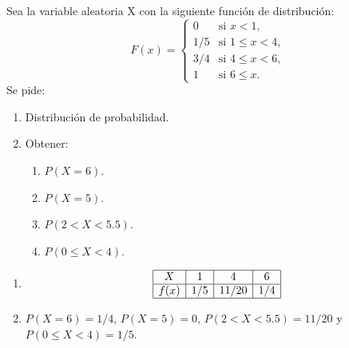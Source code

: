 {Sea la variable aleatoria X con la siguiente función de distribución:
\[
F(x)=
\begin{cases}
0 & \text{si $x<1$,} \\
1/5 & \text{si $1\leq x< 4$,} \\
3/4 & \text{si $4\leq x<6$,} \\
1 & \text{si $6\leq x$.}
\end{cases}
\]
Se pide:
\begin{enumerate}
\item  Distribución de probabilidad.
\item  Obtener:
\begin{enumerate}
\item  $P(X=6)$.
\item  $P(X=5)$.
\item  $P(2<X<5.5)$.
\item  $P(0\leq X<4)$.
\end{enumerate}
\end{enumerate}
}
{
\begin{enumerate}
\item \[
\begin{array}{|c|c|c|c|}
\hline
X & 1 & 4 & 6 \\
\hline
f(x) & 1/5 & 11/20 & 1/4\\
\hline
\end{array}
\]
\item $P(X=6)=1/4$, $P(X=5)=0$, $P(2<X<5.5)=11/20$ y $P(0\leq X<4)=1/5$.
\end{enumerate}
}
{}


